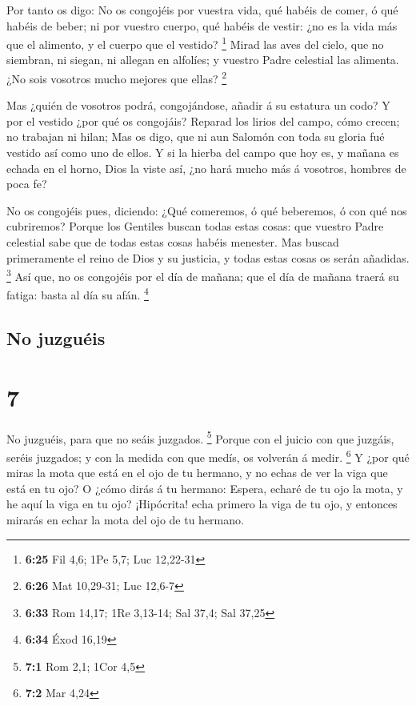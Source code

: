  Por tanto os digo: No os congojéis por vuestra vida, qué
habéis de comer, ó qué habéis de beber; ni por vuestro cuerpo, qué
habéis de vestir: ¿no es la vida más que el alimento, y el cuerpo que el
vestido? \footnote{\textbf{6:25} Fil 4,6; 1Pe 5,7; Luc 12,22-31}
 Mirad las aves del cielo, que no siembran, ni siegan, ni
allegan en alfolíes; y vuestro Padre celestial las alimenta. ¿No sois
vosotros mucho mejores que ellas? \footnote{\textbf{6:26} Mat 10,29-31;
  Luc 12,6-7}

 Mas ¿quién de vosotros podrá, congojándose, añadir á su
estatura un codo?  Y por el vestido ¿por qué os
congojáis? Reparad los lirios del campo, cómo crecen; no trabajan ni
hilan;  Mas os digo, que ni aun Salomón con toda su
gloria fué vestido así como uno de ellos.  Y si la hierba
del campo que hoy es, y mañana es echada en el horno, Dios la viste así,
¿no hará mucho más á vosotros, hombres de poca fe?

 No os congojéis pues, diciendo: ¿Qué comeremos, ó qué
beberemos, ó con qué nos cubriremos?  Porque los Gentiles
buscan todas estas cosas: que vuestro Padre celestial sabe que de todas
estas cosas habéis menester.  Mas buscad primeramente el
reino de Dios y su justicia, y todas estas cosas os serán añadidas.
\footnote{\textbf{6:33} Rom 14,17; 1Re 3,13-14; Sal 37,4; Sal 37,25}
 Así que, no os congojéis por el día de mañana; que el
día de mañana traerá su fatiga: basta al día su afán. \footnote{\textbf{6:34}
  Éxod 16,19}

\hypertarget{no-juzguuxe9is}{%
\subsection{No juzguéis}\label{no-juzguuxe9is}}

\hypertarget{section-6}{%
\section{7}\label{section-6}}

 No juzguéis, para que no seáis juzgados. \footnote{\textbf{7:1}
  Rom 2,1; 1Cor 4,5}  Porque con el juicio con que
juzgáis, seréis juzgados; y con la medida con que medís, os volverán á
medir. \footnote{\textbf{7:2} Mar 4,24}  Y ¿por qué miras
la mota que está en el ojo de tu hermano, y no echas de ver la viga que
está en tu ojo?  O ¿cómo dirás á tu hermano: Espera,
echaré de tu ojo la mota, y he aquí la viga en tu ojo? 
¡Hipócrita! echa primero la viga de tu ojo, y entonces mirarás en echar
la mota del ojo de tu hermano.

